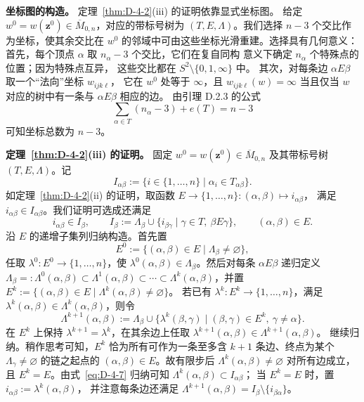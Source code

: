 \noindent\textbf{坐标图的构造。}
定理~\ref{thm:D-4-2}(iii) 的证明依靠显式坐标图。
给定 $w^0=w(\mathbf z^0)\in\overline M_{0,n}$，对应的带标号树为
$(T,E,\Lambda)$。我们选择 $n-3$ 个交比作为坐标，使其余交比在
$w^0$ 的邻域中可由这些坐标光滑重建。选择具有几何意义：
首先，每个顶点 $\alpha$ 取 $n_\alpha-3$ 个交比，它们在复自同构
意义下确定 $n_\alpha$ 个特殊点的位置；因为特殊点互异，
这些交比都在 $S^2\setminus\{0,1,\infty\}$ 中。
其次，对每条边 $\alpha E\beta$ 取一个“法向”坐标 $w_{ijk\ell}$，
它在 $w^0$ 处等于 $\infty$，且 $w_{ijk\ell}(w)=\infty$
当且仅当 $w$ 对应的树中有一条与 $\alpha E\beta$ 相应的边。
由引理 D.2.3 的公式
\[
  \sum_{\alpha\in T}(n_\alpha-3)+e(T)=n-3
\]
可知坐标总数为 $n-3$。

\noindent\textbf{定理~\ref{thm:D-4-2}(iii) 的证明。}
固定 $w^0=w(\mathbf z^0)\in\overline M_{0,n}$ 及其带标号树
$(T,E,\Lambda)$。记
\[
  I_{\alpha\beta}:=
  \{i\in\{1,\ldots,n\}\mid\alpha_i\in T_{\alpha\beta}\}.
\]
如定理~\ref{thm:D-4-2}(ii) 的证明，取函数
$E\to\{1,\ldots,n\}:(\alpha,\beta)\mapsto i_{\alpha\beta}$，
满足 $i_{\alpha\beta}\in I_{\alpha\beta}$。我们证明可选成还满足
\begin{equation}\label{eq:D-4-6}
  i_{\alpha\beta}\in I_\beta,\qquad
  I_\beta:=\Lambda_\beta\cup
  \{i_{\beta\gamma}\mid\gamma\in T,\ \beta E\gamma\},
  \qquad(\alpha,\beta)\in E.
\end{equation}
沿 $E$ 的递增子集列归纳构造。首先置
\[
  E^0:=\{(\alpha,\beta)\in E\mid\Lambda_\beta\ne\varnothing\},
\]
任取 $\lambda^0:E^0\to\{1,\ldots,n\}$，使
$\lambda^0(\alpha,\beta)\in\Lambda_\beta$。然后对每条
$\alpha E\beta$ 递归定义
$\Lambda_\beta=:\Lambda^0(\alpha,\beta)
\subset\Lambda^1(\alpha,\beta)\subset\cdots\subset
\Lambda^k(\alpha,\beta)$，并置
$E^k:=\{(\alpha,\beta)\in E\mid
\Lambda^k(\alpha,\beta)\ne\varnothing\}$。
若已有 $\lambda^k:E^k\to\{1,\ldots,n\}$，满足
$\lambda^k(\alpha,\beta)\in\Lambda^k(\alpha,\beta)$，则令
\begin{equation}\label{eq:D-4-7}
  \Lambda^{k+1}(\alpha,\beta):=\Lambda_\beta\cup
  \{\lambda^k(\beta,\gamma)\mid
  (\beta,\gamma)\in E^k,\ \gamma\ne\alpha\}.
\end{equation}
在 $E^k$ 上保持 $\lambda^{k+1}=\lambda^k$，在其余边上任取
$\lambda^{k+1}(\alpha,\beta)\in\Lambda^{k+1}(\alpha,\beta)$。
继续归纳。稍作思考可知，$E^k$ 恰为所有可作为一条至多含
$k+1$ 条边、终点为某个 $\Lambda_\gamma\ne\varnothing$ 的链之起点的
$(\alpha,\beta)\in E$。故有限步后 $\Lambda^k(\alpha,\beta)\ne\varnothing$
对所有边成立，且 $E^k=E$。由式~\eqref{eq:D-4-7} 归纳可知
$\Lambda^k(\alpha,\beta)\subset I_{\alpha\beta}$；
当 $E^k=E$ 时，置 $i_{\alpha\beta}:=\lambda^k(\alpha,\beta)$，
并注意每条边还满足
$\Lambda^{k+1}(\alpha,\beta)=I_\beta\setminus\{i_{\beta\alpha}\}$。

